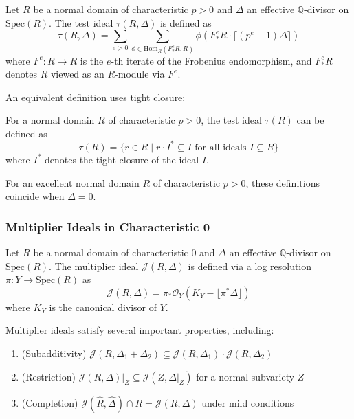 \begin{definition}\label{def:test-ideal-char-p}
Let $R$ be a normal domain of characteristic $p > 0$ and $\Delta$ an effective $\mathbb{Q}$-divisor on $\text{Spec}(R)$. The test ideal $\tau(R,\Delta)$ is defined as
$$\tau(R,\Delta) = \sum_{e > 0} \sum_{\phi \in \text{Hom}_R(F^e_*R, R)} \phi(F^e_*R \cdot \lceil(p^e-1)\Delta\rceil)$$
where $F^e: R \to R$ is the $e$-th iterate of the Frobenius endomorphism, and $F^e_*R$ denotes $R$ viewed as an $R$-module via $F^e$.
\end{definition}

An equivalent definition uses tight closure:

\begin{definition}\label{def:tight-closure-test-ideal}
For a normal domain $R$ of characteristic $p > 0$, the test ideal $\tau(R)$ can be defined as
$$\tau(R) = \{r \in R \mid r \cdot I^* \subseteq I \text{ for all ideals } I \subseteq R\}$$
where $I^*$ denotes the tight closure of the ideal $I$.
\end{definition}

For an excellent normal domain $R$ of characteristic $p > 0$, these definitions coincide when $\Delta = 0$.

\subsubsection{Multiplier Ideals in Characteristic 0}

\begin{definition}\label{def:multiplier-ideal}
Let $R$ be a normal domain of characteristic 0 and $\Delta$ an effective $\mathbb{Q}$-divisor on $\text{Spec}(R)$. The multiplier ideal $\mathcal{J}(R,\Delta)$ is defined via a log resolution $\pi: Y \to \text{Spec}(R)$ as
$$\mathcal{J}(R,\Delta) = \pi_*\mathcal{O}_Y(K_Y - \lfloor\pi^*\Delta\rfloor)$$
where $K_Y$ is the canonical divisor of $Y$.
\end{definition}

Multiplier ideals satisfy several important properties, including:
\begin{enumerate}
    \item (Subadditivity) $\mathcal{J}(R,\Delta_1+\Delta_2) \subseteq \mathcal{J}(R,\Delta_1) \cdot \mathcal{J}(R,\Delta_2)$
    \item (Restriction) $\mathcal{J}(R,\Delta)|_Z \subseteq \mathcal{J}(Z,\Delta|_Z)$ for a normal subvariety $Z$
    \item (Completion) $\mathcal{J}(\hat{R},\hat{\Delta}) \cap R = \mathcal{J}(R,\Delta)$ under mild conditions
\end{enumerate}

